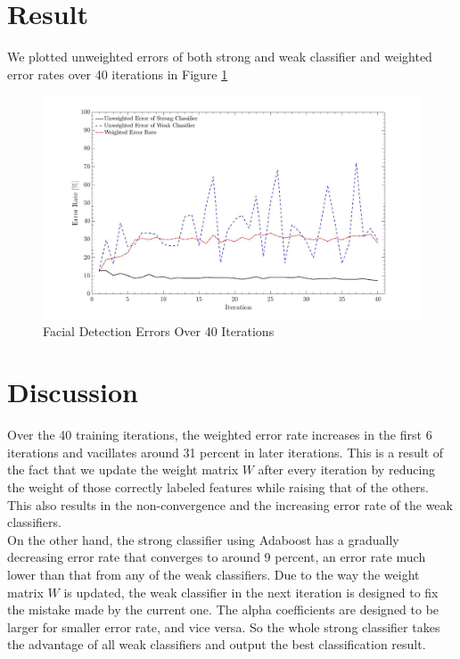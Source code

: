 \documentclass{article}
\begin{document}
	
	
	\section{Result}
	We plotted unweighted errors of both strong and weak classifier and weighted error rates over 40 iterations in Figure \ref{fig:result}
	\begin{figure}[H]
		\centering
		\includegraphics[width=\textwidth]{result}
		\caption{Facial Detection Errors Over 40 Iterations}
		\label{fig:result}
	\end{figure}
	
	\section{Discussion}
	\justify Over the 40 training iterations, the weighted error rate increases in the first 6 iterations and vacillates around 31 percent in later iterations. This is a result of the fact that we update the weight matrix $W$ after every iteration by reducing the weight of those correctly labeled features while raising that of the others. This also results in the non-convergence and the increasing error rate of the weak classifiers.\\
	\justify On the other hand, the strong classifier using Adaboost has a gradually decreasing error rate that converges to around 9 percent, an error rate much lower than that from any of the weak classifiers. Due to the way the weight matrix $W$ is updated, the weak classifier in the next iteration is designed to fix the mistake made by the current one. The alpha coefficients are designed to be larger for smaller error rate, and vice versa. So the whole strong classifier takes the advantage of all weak classifiers and output the best classification result.
\end{document}
